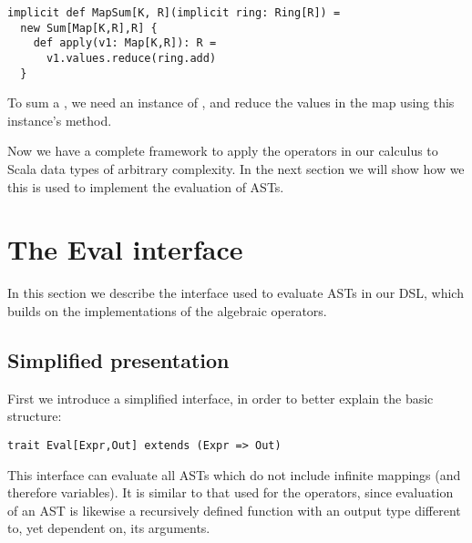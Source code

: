 \vs\begin{lstlisting}
implicit def MapSum[K, R](implicit ring: Ring[R]) =
  new Sum[Map[K,R],R] {
    def apply(v1: Map[K,R]): R =
      v1.values.reduce(ring.add)
  }
\end{lstlisting}\vs
To sum a , we need an instance of , and reduce the values in the map using this instance's  method.

Now we have a complete framework to apply the operators in our calculus to Scala data types of arbitrary complexity. In the next section we will show how we this is used to implement the evaluation of ASTs.

\section{The Eval interface}
In this section we describe the interface used to evaluate ASTs in our DSL, which builds on the implementations of the algebraic operators.
\subsection{Simplified presentation}
First we introduce a simplified interface, in order to better explain the basic structure:
\vs\begin{lstlisting}
trait Eval[Expr,Out] extends (Expr => Out)
\end{lstlisting}\vs
This interface can evaluate all ASTs which do not include infinite mappings (and therefore variables). It is similar to that used for the operators, since evaluation of an AST is likewise a recursively defined function with an output type different to, yet dependent on, its arguments.

